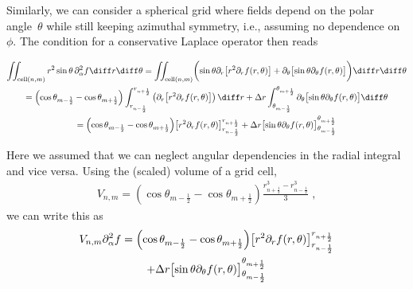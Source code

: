 \documentclass[
	superscriptaddress,
	twocolumn,
	aps, prl
]{revtex4-1}
\newcommand{\dr}{\Delta r}
\begin{document}
Similarly, we can consider a spherical grid where fields depend on the polar angle~$\theta$ while still keeping azimuthal symmetry, i.e., assuming no dependence on $\phi$.
The condition for a conservative Laplace operator then reads
\begin{widetext}
\begin{multline}
	\iint_{\text{cell}(n, m)} r^2 \sin\theta \, \partial_\alpha^2 f  \diff r \diff \theta
=
	\iint_{\text{cell}(n, m)} \biggl(
		\sin\theta  \partial_r\bigl[r^2 \partial_r f(r, \theta)\bigr]
		+ \partial_\theta \bigl[ \sin\theta \partial_\theta  f(r, \theta)\bigr]
	\biggr)\diff r \diff \theta
\\=
	\Bigl(\cos\theta_{m-\frac12} - \cos\theta_{m + \frac12}\Bigr)
		\int_{r_{n - \frac12}}^{r_{n + \frac12}}\left(
			 \partial_r\bigl[r^2 \partial_r f(r, \theta)\bigr]
		\right)  \diff r
	+ \Delta r
		\int_{\theta_{m - \frac12}}^{\theta_{m + \frac12}}
			 \partial_\theta \bigl[ \sin\theta \partial_\theta  f(r, \theta)\bigr]	 \diff\theta
\\=
	\Bigl(\cos\theta_{m-\frac12} - \cos\theta_{m + \frac12}\Bigr)
			\bigl[r^2 \partial_r f(r, \theta)\bigr]_{r_{n - \frac12}}^{r_{n + \frac12}}
	+  \Delta r
		\bigl[ \sin\theta \partial_\theta  f(r, \theta)\bigr]_{\theta_{m - \frac12}}^{\theta_{m + \frac12}}
\end{multline}
\end{widetext}
Here we assumed that we can neglect angular dependencies in the radial integral and vice versa.
Using the (scaled) volume of a grid cell,
\begin{align}
	V_{n,m} =
		\left(\cos\theta_{m-\frac12} - \cos\theta_{m + \frac12}\right)
		\frac{r_{n + \frac12}^3 - r_{n - \frac12}^3}{3}
	\;,
\end{align}
we can write this as
\begin{multline}
	V_{n,m} \partial_\alpha^2 f
=\Bigl(\cos\theta_{m-\frac12} - \cos\theta_{m + \frac12}\Bigr)
			\bigl[r^2 \partial_r f(r, \theta)\bigr]_{r_{n - \frac12}}^{r_{n + \frac12}}
\\
	+  \Delta r
		\bigl[ \sin\theta \partial_\theta  f(r, \theta)\bigr]_{\theta_{m - \frac12}}^{\theta_{m + \frac12}}
\end{multline}

%
%
\end{document}
